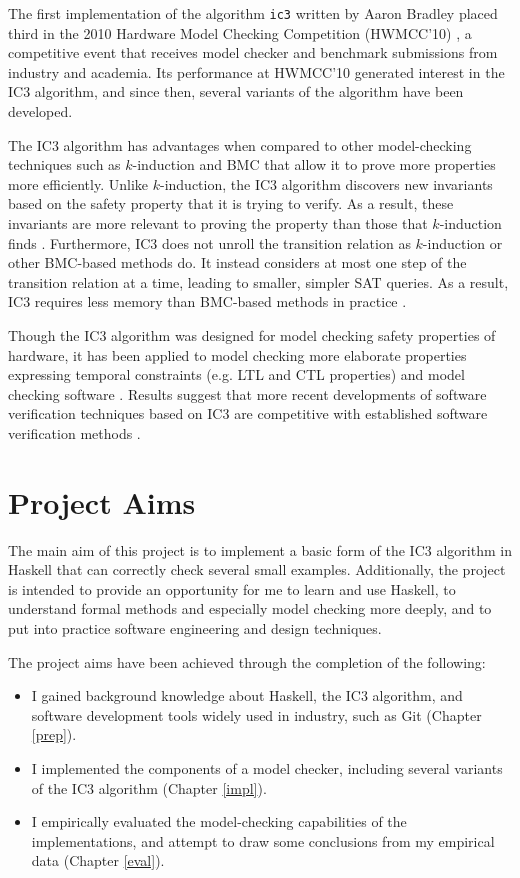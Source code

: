 \documentclass[12pt,a4paper,twoside,openright]{report}
\begin{document}
The first implementation of the algorithm \verb,ic3, written by Aaron Bradley placed third in
the 2010 Hardware Model Checking Competition (HWMCC'10) \cite{hwmcc10},
a competitive event that receives model checker and benchmark submissions from
industry and
academia. Its performance at HWMCC'10 generated interest in the IC3 algorithm, and
since then, several variants of the algorithm have been developed.

The IC3 algorithm has advantages when compared to other model-checking
techniques such as $k$-induction and BMC that allow it to prove more
properties more efficiently. Unlike $k$-induction, the IC3 algorithm
discovers new invariants based on the safety property that it is trying to
verify. As a result, these
invariants are more relevant to proving the property than those that
$k$-induction finds \cite{bradley12}.
Furthermore, IC3 does not unroll the transition relation as $k$-induction
or other BMC-based methods do. It instead considers at most one step
of the transition relation at a time, leading to smaller,
simpler SAT queries. As a result, IC3 requires less memory than BMC-based
methods in practice \cite{bradley12}.


Though the IC3 algorithm was designed for model checking safety properties of hardware,
it has been applied to model checking more
elaborate properties expressing temporal constraints (e.g. LTL and CTL
properties) and model checking software
\cite{bradley12,cimatti12}.
Results suggest that more recent developments of software verification
techniques based on IC3 are competitive with
established software verification methods \cite{birgmeier14}.

\section{Project Aims}

The main aim of this project is to implement a basic form of the IC3 algorithm in
Haskell that can correctly check several
small examples. Additionally, the project is intended to provide an opportunity
for me to learn and use Haskell, to understand formal methods and especially model
checking more deeply, and to put into practice software engineering and design techniques.

The project aims have been achieved through the completion of the following:
\begin{itemize}
\item I gained background knowledge about Haskell, the IC3 algorithm, and software
development tools widely used in industry, such as Git (Chapter \ref{prep}).
\item I implemented the components of a model checker, including several variants of
the IC3 algorithm (Chapter \ref{impl}).
\item I empirically evaluated the model-checking capabilities of the implementations,
and attempt to draw some conclusions from my empirical data
(Chapter \ref{eval}).
\end{itemize}
\end{document}
